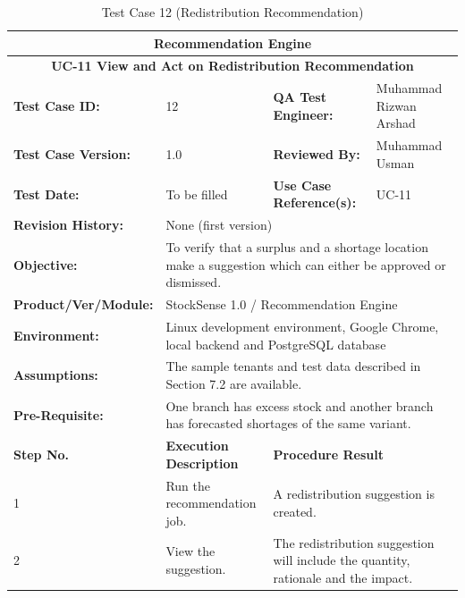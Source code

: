 \documentclass{StockSense}
\begin{document}
\begin{table}[!htbp]
\centering
\caption{Test Case 12 (Redistribution Recommendation)}
{\small\linespread{1}\selectfont
\begin{tabular}{|p{}|p{}|p{}|p{}|}
\hline
\multicolumn{4}{|c|}{\textbf{Recommendation Engine}} \\ \hline
\multicolumn{4}{|c|}{\textbf{UC-11 View and Act on Redistribution Recommendation}} \\ \hline
\textbf{Test Case ID:} & 12 & \textbf{QA Test Engineer:} & Muhammad Rizwan Arshad \\ \hline
\textbf{Test Case Version:} & 1.0 & \textbf{Reviewed By:} & Muhammad Usman \\ \hline
\textbf{Test Date:} & To be filled & \textbf{Use Case Reference(s):} & UC-11 \\ \hline
\textbf{Revision History:} & \multicolumn{3}{p{\dimexpr0.70\textwidth+4\tabcolsep\relax}|}{None (first version)} \\ \hline
\textbf{Objective:} & \multicolumn{3}{p{\dimexpr0.70\textwidth+4\tabcolsep\relax}|}{To verify that a surplus and a shortage location make a suggestion which can either be approved or dismissed.} \\ \hline
\textbf{Product/Ver/Module:} & \multicolumn{3}{p{\dimexpr0.70\textwidth+4\tabcolsep\relax}|}{StockSense 1.0 / Recommendation Engine} \\ \hline
\textbf{Environment:} & \multicolumn{3}{p{\dimexpr0.70\textwidth+4\tabcolsep\relax}|}{Linux development environment, Google Chrome, local backend and PostgreSQL database} \\ \hline
\textbf{Assumptions:} & \multicolumn{3}{p{\dimexpr0.70\textwidth+4\tabcolsep\relax}|}{The sample tenants and test data described in Section 7.2 are available.} \\ \hline
\textbf{Pre-Requisite:} & \multicolumn{3}{p{\dimexpr0.70\textwidth+4\tabcolsep\relax}|}{One branch has excess stock and another branch has forecasted shortages of the same variant.} \\ \hline
\textbf{Step No.} & \textbf{Execution Description} & \multicolumn{2}{l|}{\textbf{Procedure Result}} \\ \hline
1 & Run the recommendation job. & \multicolumn{2}{p{\dimexpr0.42\textwidth+2\tabcolsep\relax}|}{A redistribution suggestion is created.} \\ \hline
2 & View the suggestion. & \multicolumn{2}{p{\dimexpr0.42\textwidth+2\tabcolsep\relax}|}{The redistribution suggestion will include the quantity, rationale and the impact.} \\ \hline

\end{tabular}}
\end{table}
\end{document}
